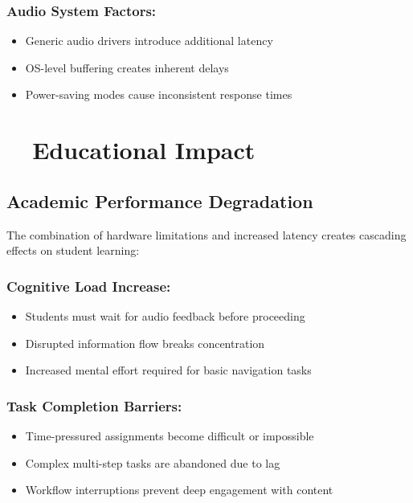 \subsubsection{Audio System Factors:}

\begin{itemize}
	\item Generic audio drivers introduce additional \gls{latency} \supercite{ASIO4ALL2023Latency}
	\item OS-level buffering creates inherent delays \supercite{LinuxAudioLatency}
	\item Power-saving modes cause inconsistent response times \supercite{WindowsPowerManagement}
\end{itemize}


\section{~~Educational Impact}\label{educational-impact}

\subsection{Academic Performance Degradation}\label{academic-performance-degradation}

The combination of hardware limitations and increased latency creates cascading effects on student learning:

\subsubsection{Cognitive Load Increase:}
\begin{itemize}
	\item Students must wait for audio feedback before proceeding \supercite{Sweller1988CognitiveLoadTheory}
	\item Disrupted information flow breaks concentration \supercite{Parasuraman2008CognitiveWorkload}
	\item Increased mental effort required for basic \gls{navigation} tasks \supercite{Wickens2008MultipleResourceTheory}
\end{itemize}

\subsubsection{Task Completion Barriers:}

\begin{itemize}
	\item Time-pressured assignments become difficult or impossible \supercite{Adams2000ImpactOfTechnology}
	\item Complex multi-step tasks are abandoned due to lag \supercite{Kirschner2006WhyMinimalGuidance}
	\item Workflow interruptions prevent deep engagement with content \supercite{Pashler1994DualTaskInterference}
\end{itemize}

